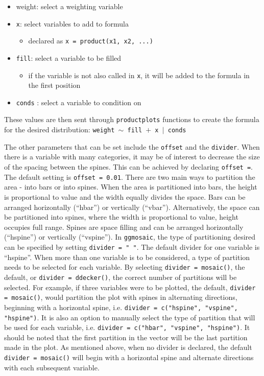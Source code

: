 \begin{itemize}
\item weight: select a weighting variable
\item \texttt{x}: select variables to add to formula
    \begin{itemize}
    \item declared as \texttt{x = product(x1, x2, ...)}
    \end{itemize}
\item \texttt{fill}: select a variable to be filled
    \begin{itemize}
    \item if the variable is not also called in \texttt{x}, it will be added to the formula in the first position
    \end{itemize}
\item \texttt{conds} : select a variable to condition on
\end{itemize}

These values are then sent through \texttt{productplots} functions to
create the formula for the desired distribution:
\texttt{weight $\sim$ fill $+$ x $|$ conds }

The other parameters that can be set include the \texttt{offset} and the
\texttt{divider}. When there is a variable with many categories, it may
be of interest to decrease the size of the spacing between the spines.
This can be achieved by declaring \texttt{offset =}. The default setting
is \texttt{offset = 0.01}. There are two main ways to partition the area
- into bars or into spines. When the area is partitioned into bars, the
height is proportional to value and the width equally divides the space.
Bars can be arranged horizontally (``hbar'') or vertically (``vbar'').
Alternatively, the space can be partitioned into spines, where the width
is proportional to value, height occupies full range. Spines are space
filling and can be arranged horizontally (``hspine'') or vertically
(``vspine''). In \texttt{ggmosaic}, the type of partitioning desired can
be specified by setting \texttt{divider = " "}. The default divider for
one variable is ``hspine''. When more than one variable is to be
considered, a type of partition needs to be selected for each variable.
By selecting \texttt{divider = mosaic()}, the default, or
\texttt{divider = ddecker()}, the correct number of partitions will be
selected. For example, if three variables were to be plotted, the
default, \texttt{divider = mosaic()}, would partition the plot with
spines in alternating directions, beginning with a horizontal spine,
i.e. \texttt{divider = c("hspine", "vspine", "hspine")}. It is also an
option to manually select the type of partition that will be used for
each variable, i.e. \texttt{divider = c("hbar", "vspine", "hspine")}. It
should be noted that the first partition in the vector will be the last
partition made in the plot. As mentioned above, when no divider is
declared, the default \texttt{divider = mosaic()} will begin with a
horizontal spine and alternate directions with each subsequent variable.

